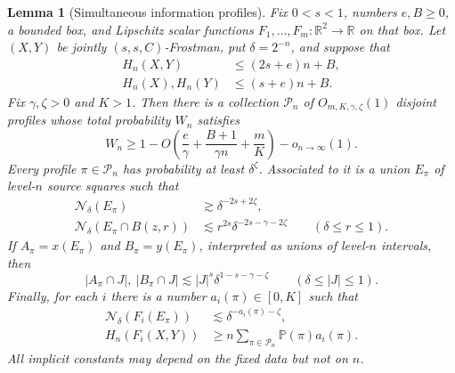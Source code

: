 \documentclass[11pt]{article}
\newtheorem{lemma}[theorem]{Lemma}
\begin{document}
\begin{lemma}[Simultaneous information profiles]
\label{lem:information-profiles}
Fix \(0<s<1\), numbers \(e,B\ge0\), a bounded box, and Lipschitz
scalar functions \(F_1,\ldots,F_m:\mathbb R^2\to\mathbb R\) on that box.  Let
\((X,Y)\) be jointly
\((s,s,C)\)-Frostman, put \(\delta=2^{-n}\), and suppose that
\begin{align}
 H_n(X,Y)&\le(2s+e)n+B,
 \label{eq:profile-source-upper}\\
 H_n(X),H_n(Y)&\le(s+e)n+B.
 \label{eq:profile-marginal-upper}
\end{align}
Fix \(\gamma,\zeta>0\) and \(K>1\).  Then there is a collection
\(\mathcal P_n\) of \(O_{m,K,\gamma,\zeta}(1)\) disjoint profiles
whose total probability \(W_n\) satisfies
\begin{equation}
 W_n\ge
 1-O\!\left(\frac{e}{\gamma}+\frac{B+1}{\gamma n}
              +\frac{m}{K}\right)-o_{n\to\infty}(1).
 \label{eq:profile-good-mass}
\end{equation}
Every profile \(\pi\in\mathcal P_n\) has probability at least
\(\delta^\zeta\).  Associated to it is a union \(E_\pi\) of
level-\(n\) source squares such that
\begin{align}
 \mathcal N_\delta(E_\pi)&\gtrsim\delta^{-2s+2\zeta},
 \label{eq:profile-set-size}\\
 \mathcal N_\delta(E_\pi\cap B(z,r))
 &\lesssim r^{2s}\delta^{-2s-\gamma-2\zeta}
 \qquad(\delta\le r\le1).
 \label{eq:profile-source-NC}
\end{align}
If \(A_\pi=x(E_\pi)\) and \(B_\pi=y(E_\pi)\), interpreted as
unions of level-\(n\) intervals, then
\begin{equation}
 |A_\pi\cap J|,\ |B_\pi\cap J|
 \lesssim |J|^s\delta^{1-s-\gamma-\zeta}
 \qquad(\delta\le |J|\le1).
 \label{eq:profile-marginal-NC}
\end{equation}
Finally, for each \(i\) there is a number \(a_i(\pi)\in[0,K]\)
such that
\begin{align}
 \mathcal N_\delta(F_i(E_\pi))
 &\lesssim\delta^{-a_i(\pi)-\zeta},
 \label{eq:profile-image-upper}\\
 H_n(F_i(X,Y))
 &\ge n\sum_{\pi\in\mathcal P_n}
          \mathbb P(\pi)a_i(\pi).
 \label{eq:profile-entropy-average}
\end{align}
All implicit constants may depend on the fixed data but not on
\(n\).
\end{lemma}
\end{document}
